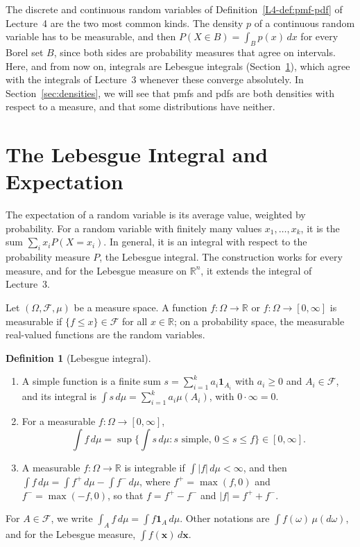 \documentclass[11pt]{article}
\theoremstyle{definition}
\newtheorem{definition}{Definition}[section]
\theoremstyle{plain}
\theoremstyle{remark}
\begin{document}
The discrete and continuous random variables of Definition~\ref{L4-def:pmf-pdf} of Lecture~4 are the two most common kinds. The density $p$ of a continuous random variable has to be measurable, and then $P(X \in B) = \int_B p(x)\, dx$ for every Borel set $B$, since both sides are probability measures that agree on intervals. Here, and from now on, integrals are Lebesgue integrals (Section~\ref{sec:lebesgue}), which agree with the integrals of Lecture~3 whenever these converge absolutely. In Section~\ref{sec:densities}, we will see that pmfs and pdfs are both densities with respect to a measure, and that some distributions have neither.

\section{The Lebesgue Integral and Expectation}\label{sec:lebesgue}

The expectation of a random variable is its average value, weighted by probability. For a random variable with finitely many values $x_1, \ldots, x_k$, it is the sum $\sum_i x_iP(X = x_i)$. In general, it is an integral with respect to the probability measure $P$, the Lebesgue integral. The construction works for every measure, and for the Lebesgue measure on $\mathbb{R}^n$, it extends the integral of Lecture~3.

Let $(\Omega, \mathcal{F}, \mu)$ be a measure space. A function $f: \Omega \to \mathbb{R}$ or $f: \Omega \to [0, \infty]$ is measurable if $\{f \leq x\} \in \mathcal{F}$ for all $x \in \mathbb{R}$; on a probability space, the measurable real-valued functions are the random variables.

\begin{definition}[Lebesgue integral]\label{def:lebesgue}
    \begin{enumerate}
        \item A simple function is a finite sum $s = \sum_{i=1}^k a_i\mathbf{1}_{A_i}$ with $a_i \geq 0$ and $A_i \in \mathcal{F}$, and its integral is $\int s\, d\mu = \sum_{i=1}^k a_i\mu(A_i)$, with $0 \cdot \infty = 0$.
        \item For a measurable $f: \Omega \to [0, \infty]$,
        \[\int f\, d\mu = \sup\Big\{\int s\, d\mu : s \text{ simple, } 0 \leq s \leq f\Big\} \in [0, \infty].\]
        \item A measurable $f: \Omega \to \mathbb{R}$ is integrable if $\int |f|\, d\mu < \infty$, and then $\int f\, d\mu = \int f^+\, d\mu - \int f^-\, d\mu$, where $f^+ = \max(f, 0)$ and $f^- = \max(-f, 0)$, so that $f = f^+ - f^-$ and $|f| = f^+ + f^-$.
    \end{enumerate}
    For $A \in \mathcal{F}$, we write $\int_A f\, d\mu = \int f\mathbf{1}_A\, d\mu$. Other notations are $\int f(\omega)\, \mu(d\omega)$, and for the Lebesgue measure, $\int f(\mathbf{x})\, d\mathbf{x}$.
\end{definition}
\end{document}
